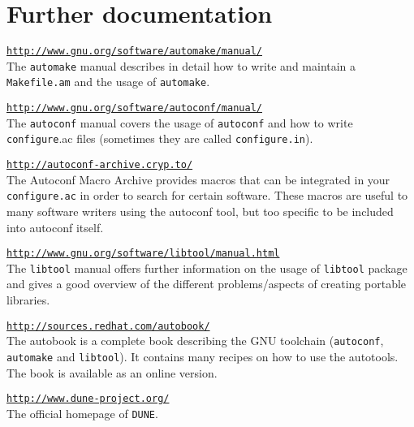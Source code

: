\documentclass[11pt,a4paper,headinclude,footinclude,DIV16,normalheadings]{scrartcl}
\newcommand{\dune}{\texttt{DUNE}\xspace}
\newcommand{\autoconf}{\texttt{autoconf}\xspace}
\newcommand{\automake}{\texttt{automake}\xspace}
\newcommand{\libtool}{\texttt{libtool}\xspace}
\newcommand{\configure}{\texttt{configure}\xspace}
\newcommand{\configureac}{\texttt{configure.ac}\xspace}
\newcommand{\makefileam}{\texttt{Makefile.am}\xspace}
\begin{document}
\section{Further documentation}

\texttt{\url{http://www.gnu.org/software/automake/manual/}}\\
The \automake manual describes in detail how to write and maintain a
\makefileam and the usage of \automake.

\texttt{\url{http://www.gnu.org/software/autoconf/manual/}}\\
The \autoconf manual covers the usage of \autoconf and how to write
\configure.ac files (sometimes they are called \texttt{configure.in}).

\texttt{\url{http://autoconf-archive.cryp.to/}}\\
The Autoconf Macro Archive provides macros that can be integrated in
your \configureac in order to search for certain software. These
macros are useful to many software writers using the autoconf tool, but too
specific to be included into autoconf itself.

\texttt{\url{http://www.gnu.org/software/libtool/manual.html}}\\
The \libtool manual offers further information on the usage of
\libtool package and gives a good overview of the different
problems/aspects of creating portable libraries.

\texttt{\url{http://sources.redhat.com/autobook/}}\\
The autobook is a complete book describing the GNU toolchain
(\autoconf, \automake and \libtool). It contains many recipes on how
to use the autotools. The book is available as an online 
version.

\texttt{\url{http://www.dune-project.org/}}\\
The official homepage of \dune.
\end{document}
